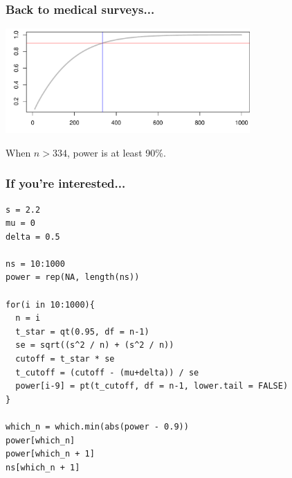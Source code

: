 \documentclass[slidestop,compress,mathserif,12pt,t,professionalfonts,xcolor=table]{beamer}
\begin{document}
\begin{frame}
\frametitle{Back to medical surveys...}

{\small
{}}

\pause

\begin{center}
\includegraphics[width=0.7\textwidth]{figures/med_hist_surveys/power_curve.pdf}
\end{center}

When $n > 334$, power is at least 90\%.

\end{frame}


\begin{frame}[fragile]
\frametitle{If you're interested...}

{\scriptsize
\begin{verbatim}
s = 2.2
mu = 0
delta = 0.5

ns = 10:1000
power = rep(NA, length(ns))

for(i in 10:1000){
  n = i
  t_star = qt(0.95, df = n-1)
  se = sqrt((s^2 / n) + (s^2 / n))
  cutoff = t_star * se
  t_cutoff = (cutoff - (mu+delta)) / se
  power[i-9] = pt(t_cutoff, df = n-1, lower.tail = FALSE)
}

which_n = which.min(abs(power - 0.9))
power[which_n]
power[which_n + 1]
ns[which_n + 1]
\end{verbatim}
}

\end{frame}
\end{document}

